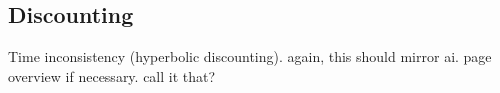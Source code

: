 
\subsection{Discounting}

Time inconsistency (hyperbolic discounting). again, this should mirror ai. page overview if necessary. call it that?

